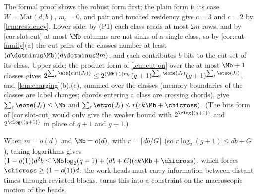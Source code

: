 \begin{outline}
The formal proof shows the robust form first; the plain form is its case $W=\mathrm{Mat}(d,b)$,
$m_c=0$, and pair and touched residency give $c=3$ and $c=2$ by \cref{lem:residency}. Lower side: by
(P1) each class reads at most $2m$ rows, and by \cref{cor:slot-cut} at most $\Mb$ columns are not
sinks of a single class, so by \cref{cor:cut-family}(a) the cut pairs of the classes number at least
$(d\dotminus\Mb)(d\dotminus2m)$, and each contributes $b$ bits to the cut set of its class. Upper
side: the product form of \cref{lem:cut-on} over the at most $\Mb+1$ classes gives
$2^{\sum_\ell\abs{\mathrm{cut}(J_\ell)}}\le2^{(\Mb+1)m_c}(q+1)^{\sum_\ell\eone(J_\ell)}(g+1)^{\sum_\ell\etwo(J_\ell)}$,
and \cref{lem:charging}(b),(c), summed over the classes (memory boundaries of the classes are label
changes; chords entering a class are crossing chords), give $\sum_\ell\eone(J_\ell)\le\Mb$ and
$\sum_\ell\etwo(J_\ell)\le r(ck\Mb+\chicross)$. (The bits form of \cref{cor:slot-cut} would only give
the weaker bound with $2^{\clog{(q+1)}}$ and $2^{\clog{(g+1)}}$ in place of $q+1$ and $g+1$.)
\end{outline}

When $m=o(d)$ and $\Mb=o(d)$, with $r=\lceil db/G\rceil$ (so $r\log_2(g+1)\le db+G$), taking logarithms
gives $(1-o(1))d^2b\le\Mb\log_2(q+1)+(db+G)(ck\Mb+\chicross)$, which forces $\chicross\ge(1-o(1))d$: the work
heads must carry information between distant times through revisited blocks.  turns this into a constraint on the macroscopic motion of the
heads.
